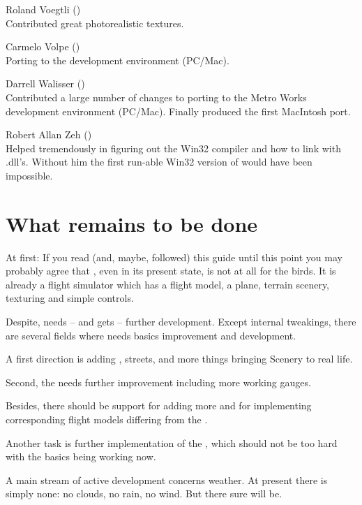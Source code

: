 \noindent Roland Voegtli ()\\
 Contributed great photorealistic textures.
\medskip


\noindent Carmelo Volpe ()\\
  Porting \FlightGear to the  development environment
  (PC/Mac).
 \medskip

\noindent Darrell Walisser ()\\
 Contributed a large number of changes to porting \FlightGear to the Metro Works
 development environment (PC/Mac). Finally produced the first MacIntosh port.
\medskip


\noindent Robert Allan Zeh ()\\
  Helped tremendously in figuring out the  Win32 compiler and
  how to link with .dll's.  Without him the first run-able Win32
  version of \FlightGear would have been impossible.

\section{What remains to be done}
At first: If you read (and, maybe, followed) this guide until this
point you may probably agree that \FlightGear\hspace{-2mm}, even
in its present state, is not at all for the birds. It is already a
flight simulator which has a flight model, a plane, terrain
scenery, texturing and simple controls.

Despite, \FlightGear needs -- and gets -- further development. Except internal tweakings,
there are several fields where \FlightGear needs basics improvement and development.

A first direction is adding , streets, and more things bringing Scenery
to real life.

Second, the  needs further improvement including more working gauges.

Besides, there should be support for adding more  and for implementing
corresponding flight models differing from the .

Another task is further implementation of the , which should not be
too hard with the basics being working now.

A main stream of active development concerns weather. At present there is simply none: no
clouds, no rain, no wind. But there sure will be.

